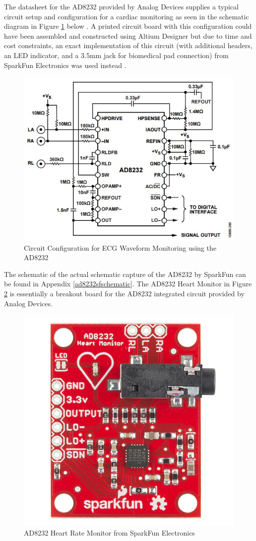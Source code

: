 The datasheet for the AD8232 provided by Analog Devices supplies a typical circuit setup and configuration for a cardiac monitoring as seen in the schematic diagram in Figure \ref{ad8232cardiacconfig} below \cite{ad8232datasheet}. A printed circuit board with this configuration could have been assembled and constructed using Altium Designer but due to time and cost constraints, an exact implementation of this circuit (with additional headers, an LED indicator, and a 3.5mm jack for biomedical pad connection) from SparkFun Electronics was used instead \cite{ad8232}.   

\begin{figure}[H]
	\centering
	\includegraphics[width=0.6\linewidth]{ad8232cardiacconfig.jpg}
	\caption{Circuit Configuration for ECG Waveform Monitoring using the AD8232 \cite{ad8232datasheet}}
	\label{ad8232cardiacconfig}
\end{figure}
 
The schematic of the actual schematic capture of the AD8232 by SparkFun can be found in Appendix \ref{ad8232sfschematic}. The AD8232 Heart Monitor in Figure \ref{ad8232sfboard} is essentially a breakout board for the AD8232 integrated circuit provided by Analog Devices. 

\begin{figure}[H]
	\centering
	\includegraphics[width=0.3\linewidth]{ad8232sfboard.jpg}
	\caption{AD8232 Heart Rate Monitor from SparkFun Electronics \cite{ad8232}}
	\label{ad8232sfboard}
\end{figure}

